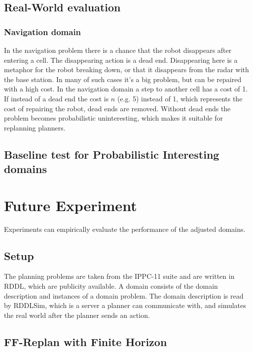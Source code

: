 \documentclass[runningheads,a4paper]{llncs}
\begin{document}
\subsection{Real-World evaluation}

\subsubsection{Navigation domain}

In the navigation problem there is a chance that the robot disappears after
entering a cell. The disappearing action is a dead end. Disappearing here is a
metaphor for the robot breaking down, or that it disappears from the radar with
the base station. In many of such cases it's a big problem, but can be repaired
with a high cost. In the navigation domain a step to another cell has a cost of
1. If instead of a dead end the cost is $n$ (e.g. 5) instead of 1, which
represents the cost of repairing the robot, dead ends are removed. Without dead
ends the problem becomes probabilistic uninteresting, which makes it suitable for
replanning planners.

\subsection{Baseline test for Probabilistic Interesting domains}


\section{Future Experiment}
\label{sec:experiment}

Experiments can empirically evaluate the performance of the adjusted domains.

\subsection{Setup}

The planning problems are taken from the IPPC-11 suite and are written in RDDL,
which are publicity available. A domain consists of the domain description and
instances of a domain problem. The domain description is read by RDDLSim, which
is a server a planner can communicate with, and simulates the real world after
the planner sends an action.

\subsection{FF-Replan with Finite Horizon}
\end{document}

